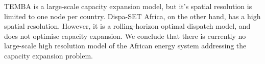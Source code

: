 \documentclass[conference, a4paper]{IEEEtran}
\begin{document}
TEMBA is a large-scale capacity expansion model, but it's spatial resolution is limited to one node per country.
Dispa-SET Africa, on the other hand, has a high spatial resolution.
However, it is a rolling-horizon optimal dispatch model, and does not optimise capacity expansion.
We conclude that there is currently no large-scale high resolution model of the African energy system addressing the capacity expansion problem.



\end{document}
